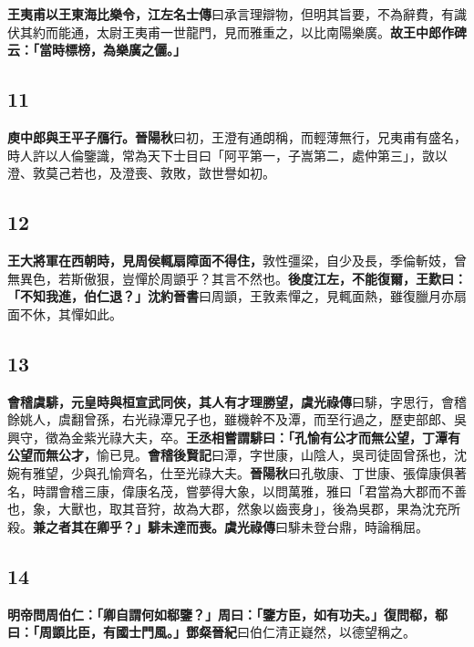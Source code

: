 \textbf{王夷甫以王東海比樂令，}{\footnotesize \textbf{江左名士傳}曰承言理辯物，但明其旨要，不為辭費，有識伏其約而能通，太尉王夷甫一世龍門，見而雅重之，以比南陽樂廣。}\textbf{故王中郎作碑云：「當時標榜，為樂廣之儷。」}

\subsection*{11}

\textbf{庾中郎與王平子鴈行。}{\footnotesize \textbf{晉陽秋}曰初，王澄有通朗稱，而輕薄無行，兄夷甫有盛名，時人許以人倫鑒識，常為天下士目曰「阿平第一，子嵩第二，處仲第三」，敳以澄、敦莫己若也，及澄喪、敦敗，敳世譽如初。}

\subsection*{12}

\textbf{王大將軍在西朝時，見周侯輒扇障面不得住，}{\footnotesize 敦性彊梁，自少及長，季倫斬妓，曾無異色，若斯傲狠，豈憚於周顗乎？其言不然也。}\textbf{後度江左，不能復爾，王歎曰：「不知我進，伯仁退？」}{\footnotesize \textbf{沈約晉書}曰周顗，王敦素憚之，見輒面熱，雖復臘月亦扇面不休，其憚如此。}

\subsection*{13}

\textbf{會稽虞騑，元皇時與桓宣武同俠，其人有才理勝望，}{\footnotesize \textbf{虞光祿傳}曰騑，字思行，會稽餘姚人，虞翻曾孫，右光祿潭兄子也，雖機幹不及潭，而至行過之，歷吏部郎、吳興守，徵為金紫光祿大夫，卒。}\textbf{王丞相嘗謂騑曰：「孔愉有公才而無公望，丁潭有公望而無公才，}{\footnotesize 愉已見。\textbf{會稽後賢記}曰潭，字世康，山陰人，吳司徒固曾孫也，沈婉有雅望，少與孔愉齊名，仕至光祿大夫。\textbf{晉陽秋}曰孔敬康、丁世康、張偉康俱著名，時謂會稽三康，偉康名茂，嘗夢得大象，以問萬雅，雅曰「君當為大郡而不善也，象，大獸也，取其音狩，故為大郡，然象以齒喪身」，後為吳郡，果為沈充所殺。}\textbf{兼之者其在卿乎？」騑未達而喪。}{\footnotesize \textbf{虞光祿傳}曰騑未登台鼎，時論稱屈。}

\subsection*{14}

\textbf{明帝問周伯仁：「卿自謂何如郗鑒？」周曰：「鑒方臣，如有功夫。」復問郗，郗曰：「周顗比臣，有國士門風。」}{\footnotesize \textbf{鄧粲晉紀}曰伯仁清正嶷然，以德望稱之。}

